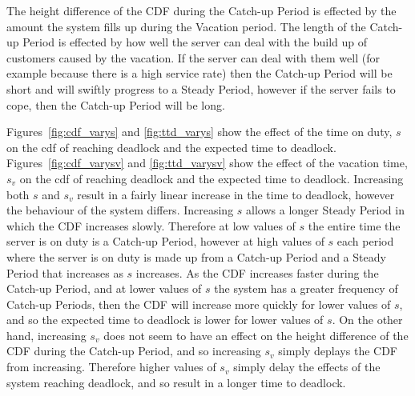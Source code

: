 \documentclass{article}
\begin{document}
The height difference of the CDF during the Catch-up Period is effected by the amount the system fills up during the Vacation period.
The length of the Catch-up Period is effected by how well the server can deal with the build up of customers caused by the vacation. If the server can deal with them well (for example because there is a high service rate) then the Catch-up Period will be short and will swiftly progress to a Steady Period, however if the server fails to cope, then the Catch-up Period will be long.

Figures~\ref{fig:cdf_varys} and \ref{fig:ttd_varys} show the effect of the time on duty, $s$ on the cdf of reaching deadlock and the expected time to deadlock.
Figures~\ref{fig:cdf_varysv} and \ref{fig:ttd_varysv} show the effect of the vacation time, $s_v$ on the cdf of reaching deadlock and the expected time to deadlock.
Increasing both $s$ and $s_v$ result in a fairly linear increase in the time to deadlock, however the behaviour of the system differs.
Increasing $s$ allows a longer Steady Period in which the CDF increases slowly.
Therefore at low values of $s$ the entire time the server is on duty is a Catch-up Period, however at high values of $s$ each period where the server is on duty is made up from a Catch-up Period and a Steady Period that increases as $s$ increases.
As the CDF increases faster during the Catch-up Period, and at lower values of $s$ the system has a greater frequency of Catch-up Periods, then the CDF will increase more quickly for lower values of $s$, and so the expected time to deadlock is lower for lower values of $s$.
On the other hand, increasing $s_v$ does not seem to have an effect on the height difference of the CDF during the Catch-up Period, and so increasing $s_v$ simply deplays the CDF from increasing.
Therefore higher values of $s_v$ simply delay the effects of the system reaching deadlock, and so result in a longer time to deadlock.
\end{document}
